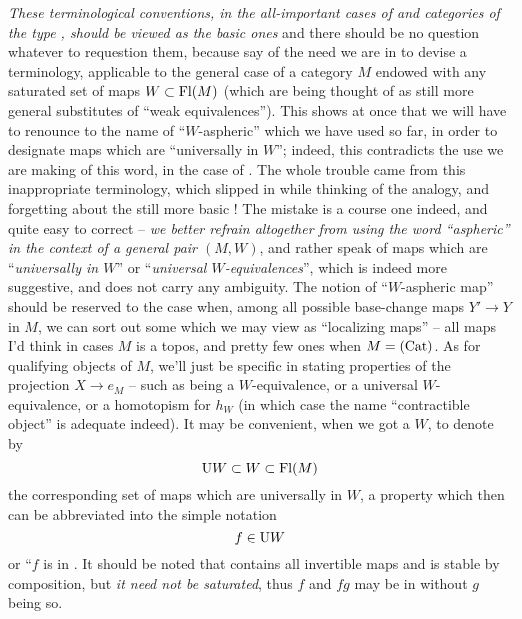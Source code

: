 \emph{These terminological conventions, in the all-important cases of
  \Cat{} and categories of the type \Ahat, should be viewed as the
  basic ones} and there should be no question whatever to requestion
them, because say of the need we are in to devise a terminology,
applicable to the general case of a category $M$ endowed with any
saturated set of maps $W\subset\operatorname{Fl}(M)$ (which are being thought of as
still more general substitutes of ``weak equivalences''). This shows
at once that we will have to renounce to the name of ``$W$-aspheric''
which we have used so far, in order to designate maps which are
``universally in $W$''; indeed, this contradicts the use we are making
of this word, in the case of \Cat. The whole trouble came from this
inappropriate terminology, which slipped in while thinking of the
\Ahat{} analogy, and forgetting about the still more basic \Cat! The
mistake is a course one indeed, and quite easy to correct -- \emph{we
  better refrain altogether from using the word ``aspheric'' in the
  context of a general pair $(M,W)$}, and rather speak of maps which
are ``\emph{universally in $W$}'' or ``\emph{universal
  $W$-equivalences}'', which is indeed more suggestive, and does not
carry any ambiguity. The notion of ``$W$-aspheric map'' should be
reserved to the case when, among all possible base-change maps $Y'\to
Y$ in $M$, we can sort out some which we may view as ``localizing
maps'' -- all maps I'd think in cases $M$ is a topos, and pretty few
ones when $M={(\mathrm{Cat})}$. As for qualifying objects of $M$, we'll just be
specific in stating properties of the projection $X\to e_M$ -- such as
being a $W$-equivalence, or a universal $W$-equivalence, or a
homotopism for $h_W$ (in which case the name ``contractible object''
is adequate indeed). It may be convenient, when we got a $W$, to
denote by
\[{\mathrm UW}\subset W\subset \operatorname{Fl}(M)\]
the corresponding set of maps which are universally in $W$, a
property which then can be abbreviated into the simple notation
\[ f\in {\ensuremath{\mathrm UW}}\]
or ``$f$ is in \UW. It should be noted that \UW{} contains all
invertible maps and is stable by composition, but \emph{it need not be
  saturated}, thus $f$ and $fg$ may be in \UW{} without $g$ being so.

